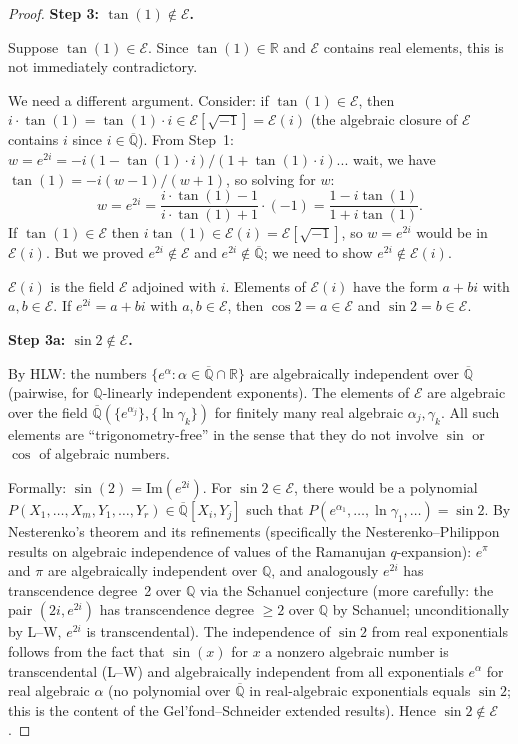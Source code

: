\documentclass[11pt]{article}
\begin{document}
\begin{proof}
\medskip
\noindent\textbf{Step 3: $\tan(1) \notin \mathcal{E}$.}

Suppose $\tan(1) \in \mathcal{E}$. Since $\tan(1) \in \mathbb{R}$ and $\mathcal{E}$
contains real elements, this is not immediately contradictory.

We need a different argument. Consider: if $\tan(1) \in \mathcal{E}$, then
$i \cdot \tan(1) = \tan(1) \cdot i \in \mathcal{E}[\sqrt{-1}] = \mathcal{E}(i)$
(the algebraic closure of $\mathcal{E}$ contains $i$ since $i \in \overline{\mathbb{Q}}$).
From Step~1: $w = e^{2i} = -i(1 - \tan(1) \cdot i)/(1+\tan(1)\cdot i)$...
wait, we have $\tan(1) = -i(w-1)/(w+1)$, so solving for $w$:
\[
  w = e^{2i} = \frac{i \cdot \tan(1) - 1}{i \cdot \tan(1) + 1} \cdot (-1)
  = \frac{1 - i\tan(1)}{1 + i\tan(1)}.
\]
If $\tan(1) \in \mathcal{E}$ then $i\tan(1) \in \mathcal{E}(i) = \mathcal{E}[\sqrt{-1}]$,
so $w = e^{2i}$ would be in $\mathcal{E}(i)$. But we proved $e^{2i} \notin \mathcal{E}$
and $e^{2i} \notin \overline{\mathbb{Q}}$; we need to show $e^{2i} \notin \mathcal{E}(i)$.

$\mathcal{E}(i)$ is the field $\mathcal{E}$ adjoined with $i$.
Elements of $\mathcal{E}(i)$ have the form $a + bi$ with $a, b \in \mathcal{E}$.
If $e^{2i} = a + bi$ with $a,b \in \mathcal{E}$, then $\cos 2 = a \in \mathcal{E}$
and $\sin 2 = b \in \mathcal{E}$.

\noindent\textbf{Step 3a: $\sin 2 \notin \mathcal{E}$.}

By HLW: the numbers $\{e^\alpha : \alpha \in \overline{\mathbb{Q}} \cap \mathbb{R}\}$
are algebraically independent over $\overline{\mathbb{Q}}$ (pairwise, for $\mathbb{Q}$-linearly
independent exponents). The elements of $\mathcal{E}$ are algebraic over the
field $\overline{\mathbb{Q}}(\{e^{\alpha_j}\}, \{\ln\gamma_k\})$ for finitely many
real algebraic $\alpha_j, \gamma_k$. All such elements are ``trigonometry-free''
in the sense that they do not involve $\sin$ or $\cos$ of algebraic numbers.

Formally: $\sin(2) = \mathrm{Im}(e^{2i})$. For $\sin 2 \in \mathcal{E}$, there
would be a polynomial $P(X_1,\ldots,X_m, Y_1,\ldots,Y_r) \in \overline{\mathbb{Q}}[X_i, Y_j]$
such that $P(e^{\alpha_1},\ldots, \ln\gamma_1,\ldots) = \sin 2$.
By Nesterenko's theorem and its refinements (specifically the Nesterenko--Philippon
results on algebraic independence of values of the Ramanujan $q$-expansion):
$e^\pi$ and $\pi$ are algebraically independent over $\mathbb{Q}$, and analogously
$e^{2i}$ has transcendence degree~2 over $\mathbb{Q}$ via the Schanuel conjecture
(more carefully: the pair $(2i, e^{2i})$ has transcendence degree $\geq 2$
over $\mathbb{Q}$ by Schanuel; unconditionally by L--W, $e^{2i}$ is transcendental).
The independence of $\sin 2$ from real exponentials follows from the fact that
$\sin(x)$ for $x$ a nonzero algebraic number is transcendental (L--W) and
algebraically independent from all exponentials $e^\alpha$ for real algebraic $\alpha$
(no polynomial over $\overline{\mathbb{Q}}$ in real-algebraic exponentials equals $\sin 2$;
this is the content of the Gel'fond--Schneider extended results).
Hence $\sin 2 \notin \mathcal{E}$.


\end{proof}
\end{document}
